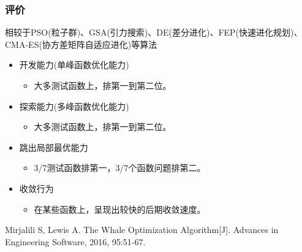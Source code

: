 \begin{frame}
  \frametitle{评价}
\begin{block}{相较于PSO(粒子群)、GSA(引力搜索)、DE(差分进化)、FEP(快速进化规划)、CMA-ES(协方差矩阵自适应进化)等算法
	}
	\begin{itemize}
		\item 开发能力(单峰函数优化能力)
			\begin{itemize}
				\item 大多测试函数上，排第一到第二位。
			\end{itemize}
		\item 探索能力(多峰函数优化能力)
		\begin{itemize}
				\item 大多测试函数上，排第一到第二位。
			\end{itemize}
		\item 跳出局部最优能力
		\begin{itemize}
				\item 3/7测试函数排第一，3/7个函数问题排第二。
			\end{itemize}
		\item 收敛行为
		\begin{itemize}
				\item 在某些函数上，呈现出较快的后期收敛速度。
			\end{itemize}
	\end{itemize}
	Mirjalili S, Lewis A. The Whale Optimization Algorithm[J]. Advances in Engineering Software, 2016, 95:51-67.
	\end{block}
	
\end{frame}


